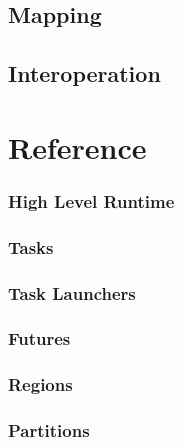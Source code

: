 \documentclass[11pt]{book}
\begin{document}
\chapter{Mapping}
\label{chap:mapping}

\chapter{Interoperation}
\label{chap:interop}

\part{Reference}

\section{High Level Runtime}

\section{Tasks}

\section{Task Launchers}

\section{Futures}

\section{Regions}

\section{Partitions}




\end{document}
